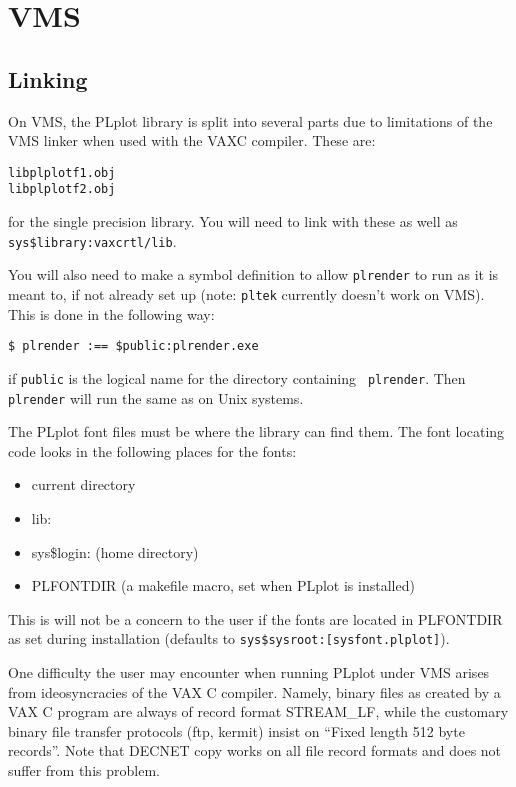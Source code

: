 \section{VMS}

\subsection{Linking}

On VMS, the PLplot library is split into several parts due to limitations
of the VMS linker when used with the VAXC compiler.  These are:
\begin{verbatim}
libplplotf1.obj
libplplotf2.obj
\end{verbatim}
for the single precision library.  You will need to link with these
as well as {\tt sys\$library:vaxcrtl/lib}.

You will also need to make a symbol definition to allow {\tt plrender} to
run as it is meant to, if not already set up (note: {\tt pltek} currently
doesn't work on VMS).  This is done in the following way:
\begin{verbatim}
$ plrender :== $public:plrender.exe
\end{verbatim}
if {\tt public} is the logical name for the directory containing {\tt
plrender}.  Then {\tt plrender} will run the same as on Unix systems.

The PLplot font files must be where the library can find them.
The font locating code looks in the following places for the fonts:
\begin{itemize}
\item	current directory
\item	lib:
\item	sys\$login:	(home directory)
\item	PLFONTDIR	(a makefile macro, set when PLplot is installed)
\end{itemize}
This is will not be a concern to the user if the fonts are located
in PLFONTDIR as set during installation (defaults to
{\tt sys\$sysroot:[sysfont.plplot]}). 

One difficulty the user may encounter when running PLplot under VMS arises
from ideosyncracies of the VAX C compiler.  Namely, binary files as created
by a VAX C program are always of record format STREAM\_LF, while the
customary binary file transfer protocols (ftp, kermit) insist on ``Fixed
length 512 byte records''.  Note that DECNET copy works on all file record
formats and does not suffer from this problem.  

